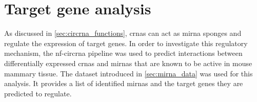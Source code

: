 \section{Target gene analysis}

As discussed in \cref{sec:circrna_functions}, \glspl{crna} can act as
\gls{mirna} sponges and regulate the expression of target genes.
In order to investigate this regulatory mechanism, the \gls{nf-circrna}
pipeline was used to predict interactions between differentially expressed
\glspl{crna} and \glspl{mirna} that are known to be active in mouse mammary
tissue.
The dataset introduced in \cref{sec:mirna_data} was used for this analysis.
It provides a list of identified \glspl{mirna} and the target genes they are
predicted to regulate.
